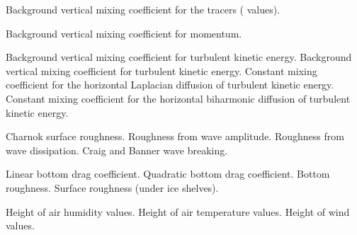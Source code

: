 \begin{klist}
     \begin{klist}
         Background vertical mixing coefficient
     for the tracers ( values).
     \end{klist}
     \begin{klist}
         Background vertical mixing coefficient 
     for momentum.
     \end{klist}
     \begin{klist}
         Background vertical mixing coefficient
     for turbulent kinetic energy.
         Background vertical mixing coefficient
     for turbulent kinetic energy.
           Constant mixing coefficient for the horizontal
     Laplacian diffusion of turbulent kinetic energy.
           Constant mixing coefficient for the horizontal
     biharmonic diffusion of turbulent kinetic energy.
     \end{klist}
     \begin{klist}
     \end{klist}
     \begin{klist}
        Charnok surface roughness.
        Roughness from wave amplitude.
        Roughness from wave dissipation.
        Craig and Banner wave breaking.
     \end{klist}
     \begin{klist}
            Linear bottom drag coefficient.
           Quadratic bottom drag coefficient.
              Bottom roughness.
              Surface roughness (under ice shelves).
     \end{klist}
     \begin{klist}
        Height of air humidity values.
        Height of air temperature values.
        Height of wind values.

\end{klist}
\end{klist}
